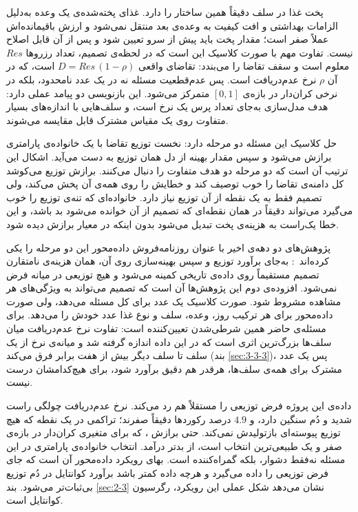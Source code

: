 پخت غذا در سلف دقیقاً همین ساختار را دارد. غذای پخته‌شده‌ی یک وعده به‌دلیل الزامات
بهداشتی و افت کیفیت به وعده‌ی بعد منتقل نمی‌شود و ارزش باقیمانده‌اش عملاً صفر است؛ مقدار
پخت باید پیش از سرو تعیین شود و پس از آن قابل اصلاح نیست. تفاوت مهم با صورت کلاسیک این
است که در لحظه‌ی تصمیم، تعداد رزروها $Res$ معلوم است و سقف تقاضا را می‌بندد: تقاضای
واقعی $D = Res\,(1-\rho)$ است، که در آن $\rho$ نرخ عدم‌دریافت است. پس عدم‌قطعیت مسئله نه
در یک عدد نامحدود، بلکه در نرخی کران‌دار در بازه‌ی $[0,1]$ متمرکز می‌شود. این بازنویسی
دو پیامد عملی دارد: هدف مدل‌سازی به‌جای تعداد پرس یک نرخ است، و سلف‌هایی با اندازه‌های
بسیار متفاوت روی یک مقیاس مشترک قابل مقایسه می‌شوند.

حل کلاسیک این مسئله دو مرحله دارد: نخست توزیع تقاضا با یک خانواده‌ی پارامتری برازش
می‌شود و سپس مقدار بهینه از دل همان توزیع به دست می‌آید. اشکال این ترتیب آن است که دو
مرحله دو هدف متفاوت را دنبال می‌کنند. برازش توزیع می‌کوشد کل دامنه‌ی تقاضا را خوب
توصیف کند و خطایش را روی همه‌ی آن پخش می‌کند، ولی تصمیم فقط به یک نقطه از آن توزیع
نیاز دارد. خانواده‌ای که تنه‌ی توزیع را خوب می‌گیرد می‌تواند دقیقاً در همان نقطه‌ای که
تصمیم از آن خوانده می‌شود بد باشد، و این خطا یک‌راست به هزینه‌ی پخت تبدیل می‌شود بدون
اینکه در معیار برازش دیده شود.

پژوهش‌های دو دهه‌ی اخیر با عنوان روزنامه‌فروش داده‌محور این دو مرحله را یکی کرده‌اند~\cite{BanRudin19bigdata,Huber19datadecision}:
به‌جای برآورد توزیع و سپس بهینه‌سازی روی آن، همان هزینه‌ی نامتقارن تصمیم مستقیماً روی
داده‌ی تاریخی کمینه می‌شود و هیچ توزیعی در میانه فرض نمی‌شود. افزوده‌ی دوم این
پژوهش‌ها آن است که تصمیم می‌تواند به ویژگی‌های هر مشاهده مشروط شود. صورت کلاسیک یک عدد
برای کل مسئله می‌دهد، ولی صورت داده‌محور برای هر ترکیب روز، وعده، سلف و نوع غذا عدد
خودش را می‌دهد. برای مسئله‌ی حاضر همین شرطی‌شدن تعیین‌کننده است: تفاوت نرخ عدم‌دریافت
میان سلف‌ها بزرگ‌ترین اثری است که در این داده اندازه گرفته شد و میانه‌ی نرخ از یک سلف
تا سلف دیگر بیش از هفت برابر فرق می‌کند (بند \ref{sec:3-3-3})، پس یک عدد مشترک برای
همه‌ی سلف‌ها، هرقدر هم دقیق برآورد شود، برای هیچ‌کدامشان درست نیست.

داده‌ی این پروژه فرض توزیعی را مستقلاً هم رد می‌کند. نرخ عدم‌دریافت چولگی راست شدید و
دُم سنگین دارد، و $4.9$ درصد رکوردها دقیقاً صفرند؛ تراکمی در یک نقطه که هیچ توزیع
پیوسته‌ای بازتولیدش نمی‌کند. حتی برازش ، که برای متغیری کران‌دار در بازه‌ی صفر
و یک طبیعی‌ترین انتخاب است، از  بدتر درآمد. انتخاب خانواده‌ی پارامتری در این
مسئله نه‌فقط دشوار، بلکه گمراه‌کننده است. بهای رویکرد داده‌محور آن است که جای فرض
توزیعی را داده می‌گیرد و هرچه داده کمتر باشد برآورد کوانتایل در دُم توزیع بی‌ثبات‌تر
می‌شود. بند \ref{sec:2-3} نشان می‌دهد شکل عملی این رویکرد، رگرسیون کوانتایل است.

